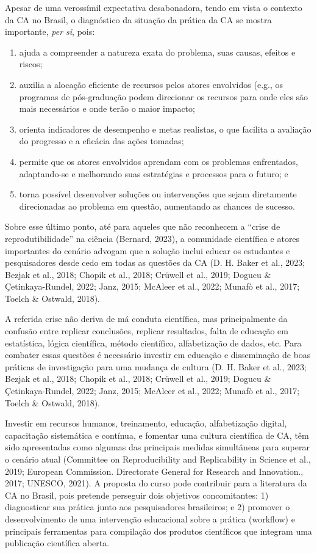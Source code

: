 \documentclass[
  a4paper,
]{book}
\begin{document}
Apesar de uma verossímil expectativa desabonadora, tendo em vista o
contexto da CA no Brasil, o diagnóstico da situação da prática da CA se
mostra importante, \emph{per si}, pois:

\begin{enumerate}
\def\labelenumi{\arabic{enumi}.}
\item
  ajuda a compreender a natureza exata do problema, suas causas, efeitos
  e riscos;
\item
  auxilia a alocação eficiente de recursos pelos atores envolvidos
  (e.g., os programas de pós-graduação podem direcionar os recursos para
  onde eles são mais necessários e onde terão o maior impacto;
\item
  orienta indicadores de desempenho e metas realistas, o que facilita a
  avaliação do progresso e a eficácia das ações tomadas;
\item
  permite que os atores envolvidos aprendam com os problemas
  enfrentados, adaptando-se e melhorando suas estratégias e processos
  para o futuro; e
\item
  torna possível desenvolver soluções ou intervenções que sejam
  diretamente direcionadas ao problema em questão, aumentando as chances
  de sucesso.
\end{enumerate}

Sobre esse último ponto, até para aqueles que não reconhecem a ``crise
de reprodutibilidade'' na ciência (Bernard, 2023), a comunidade
científica e atores importantes do cenário advogam que a solução inclui
educar os estudantes e pesquisadores desde cedo em todas as questões da
CA (D. H. Baker et al., 2023; Bezjak et al., 2018; Chopik et al., 2018;
Crüwell et al., 2019; Dogucu \& Çetinkaya-Rundel, 2022; Janz, 2015;
McAleer et al., 2022; Munafò et al., 2017; Toelch \& Ostwald, 2018).

A referida crise não deriva de má conduta científica, mas principalmente
da confusão entre replicar conclusões, replicar resultados, falta de
educação em estatística, lógica científica, método científico,
alfabetização de dados, etc. Para combater essas questões é necessário
investir em educação e disseminação de boas práticas de investigação
para uma mudança de cultura (D. H. Baker et al., 2023; Bezjak et al.,
2018; Chopik et al., 2018; Crüwell et al., 2019; Dogucu \&
Çetinkaya-Rundel, 2022; Janz, 2015; McAleer et al., 2022; Munafò et al.,
2017; Toelch \& Ostwald, 2018).

Investir em recursos humanos, treinamento, educação, alfabetização
digital, capacitação sistemática e contínua, e fomentar uma cultura
científica de CA, têm sido apresentadas como algumas das principais
medidas simultâneas para superar o cenário atual (Committee on
Reproducibility and Replicability in Science et al., 2019; European
Commission. Directorate General for Research and Innovation., 2017;
UNESCO, 2021). A proposta do curso pode contribuir para a literatura da
CA no Brasil, pois pretende perseguir dois objetivos concomitantes: 1)
diagnosticar sua prática junto aos pesquisadores brasileiros; e 2)
promover o desenvolvimento de uma intervenção educacional sobre a
prática (workflow) e principais ferramentas para compilação dos produtos
científicos que integram uma publicação científica aberta.
\end{document}
